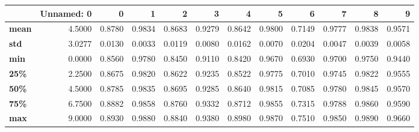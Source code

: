 \begin{tabular}{lrrrrrrrrrrr}
\toprule
{} &  Unnamed: 0 &       0 &       1 &       2 &       3 &       4 &       5 &       6 &       7 &       8 &       9 \\
\midrule
\textbf{mean} &      4.5000 &  0.8780 &  0.9834 &  0.8683 &  0.9279 &  0.8642 &  0.9800 &  0.7149 &  0.9777 &  0.9838 &  0.9571 \\
\textbf{std } &      3.0277 &  0.0130 &  0.0033 &  0.0119 &  0.0080 &  0.0162 &  0.0070 &  0.0204 &  0.0047 &  0.0039 &  0.0058 \\
\textbf{min } &      0.0000 &  0.8560 &  0.9780 &  0.8450 &  0.9110 &  0.8420 &  0.9670 &  0.6930 &  0.9700 &  0.9750 &  0.9440 \\
\textbf{25\% } &      2.2500 &  0.8675 &  0.9820 &  0.8622 &  0.9235 &  0.8522 &  0.9775 &  0.7010 &  0.9745 &  0.9822 &  0.9555 \\
\textbf{50\% } &      4.5000 &  0.8785 &  0.9835 &  0.8695 &  0.9285 &  0.8640 &  0.9815 &  0.7085 &  0.9780 &  0.9845 &  0.9570 \\
\textbf{75\% } &      6.7500 &  0.8882 &  0.9858 &  0.8760 &  0.9332 &  0.8712 &  0.9855 &  0.7315 &  0.9788 &  0.9860 &  0.9590 \\
\textbf{max } &      9.0000 &  0.8930 &  0.9880 &  0.8840 &  0.9380 &  0.8980 &  0.9870 &  0.7510 &  0.9850 &  0.9890 &  0.9660 \\
\bottomrule
\end{tabular}
